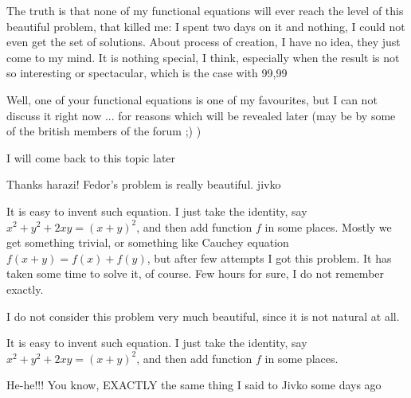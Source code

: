 \begin{solution}
	The truth is that none of my functional equations will ever reach the level of this beautiful problem, that killed me: I spent two days on it and nothing, I could not even get the set of solutions. About process of creation, I have no idea, they just come to my mind. It is nothing special, I think, especially when the result is not so interesting or spectacular, which is the case with 99,99%
\end{solution}



\begin{solution}
	Well, one of your functional equations is one of my favourites, but I can not discuss it right now ... for reasons which will be revealed later (may be by some of the british members of the forum ;) )

I will come back to this topic later 

Thanks harazi! Fedor's problem is really beautiful.
jivko
\end{solution}



\begin{solution}
	It is easy to invent such equation. I just take the identity, say $x^2+y^2+2xy=(x+y)^2$, and then add function $f$ in some places. Mostly we get something trivial, or something like Cauchey equation $f(x+y)=f(x)+f(y)$, but after few attempts I got this problem. It has taken some time to solve it, of course. Few hours for sure, I do not remember exactly.

I do not consider this problem very much beautiful, since it is not natural at all.
\end{solution}



\begin{solution}
	\begin{tcolorbox}It is easy to invent such equation. I just take the identity, say $x^2+y^2+2xy=(x+y)^2$, and then add function $f$ in some places.\end{tcolorbox}
He-he!!! You know, EXACTLY the same thing I said to Jivko some days ago  
\end{solution}



